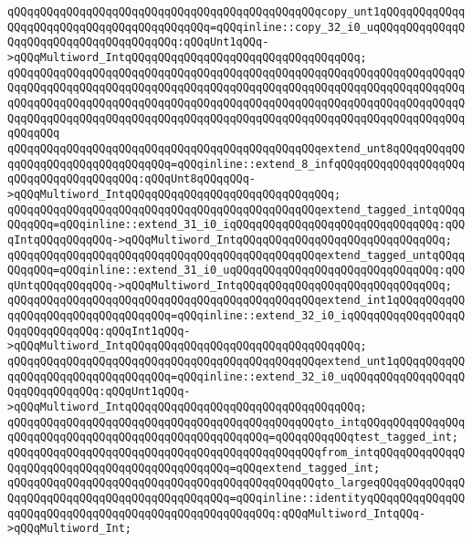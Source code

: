 \verb|qQQqqQQqqQQqqQQqqQQqqQQqqQQqqQQqqQQqqQQqqQQqqQQqcopy_unt1qQQqqQQqqQQqqQQqqQQqqQQqqQQqqQQqqQQqqQQqqQQq=qQQqinline::copy_32_i0_uqQQqqQQqqQQqqQQqqQQqqQQqqQQqqQQqqQQqqQQq:qQQqUnt1qQQq->qQQqMultiword_IntqQQqqQQqqQQqqQQqqQQqqQQqqQQqqQQqqQQq;|\newline
\verb|qQQqqQQqqQQqqQQqqQQqqQQqqQQqqQQqqQQqqQQqqQQqqQQqqQQqqQQqqQQqqQQqqQQqqQQqqQQqqQQqqQQqqQQqqQQqqQQqqQQqqQQqqQQqqQQqqQQqqQQqqQQqqQQqqQQqqQQqqQQqqQQqqQQqqQQqqQQqqQQqqQQqqQQqqQQqqQQqqQQqqQQqqQQqqQQqqQQqqQQqqQQqqQQqqQQqqQQqqQQqqQQqqQQqqQQqqQQqqQQqqQQqqQQqqQQqqQQqqQQqqQQqqQQqqQQqqQQqqQQqqQQqqQQq|\newline
\verb|qQQqqQQqqQQqqQQqqQQqqQQqqQQqqQQqqQQqqQQqqQQqqQQqextend_unt8qQQqqQQqqQQqqQQqqQQqqQQqqQQqqQQqqQQq=qQQqinline::extend_8_infqQQqqQQqqQQqqQQqqQQqqQQqqQQqqQQqqQQqqQQq:qQQqUnt8qQQqqQQq->qQQqMultiword_IntqQQqqQQqqQQqqQQqqQQqqQQqqQQqqQQq;|\newline
\verb|qQQqqQQqqQQqqQQqqQQqqQQqqQQqqQQqqQQqqQQqqQQqqQQqextend_tagged_intqQQqqQQqqQQq=qQQqinline::extend_31_i0_iqQQqqQQqqQQqqQQqqQQqqQQqqQQqqQQq:qQQqIntqQQqqQQqqQQq->qQQqMultiword_IntqQQqqQQqqQQqqQQqqQQqqQQqqQQqqQQq;|\newline
\verb|qQQqqQQqqQQqqQQqqQQqqQQqqQQqqQQqqQQqqQQqqQQqqQQqextend_tagged_untqQQqqQQqqQQq=qQQqinline::extend_31_i0_uqQQqqQQqqQQqqQQqqQQqqQQqqQQqqQQq:qQQqUntqQQqqQQqqQQq->qQQqMultiword_IntqQQqqQQqqQQqqQQqqQQqqQQqqQQqqQQq;|\newline
\verb|qQQqqQQqqQQqqQQqqQQqqQQqqQQqqQQqqQQqqQQqqQQqqQQqextend_int1qQQqqQQqqQQqqQQqqQQqqQQqqQQqqQQqqQQq=qQQqinline::extend_32_i0_iqQQqqQQqqQQqqQQqqQQqqQQqqQQqqQQq:qQQqInt1qQQq->qQQqMultiword_IntqQQqqQQqqQQqqQQqqQQqqQQqqQQqqQQqqQQq;|\newline
\verb|qQQqqQQqqQQqqQQqqQQqqQQqqQQqqQQqqQQqqQQqqQQqqQQqextend_unt1qQQqqQQqqQQqqQQqqQQqqQQqqQQqqQQqqQQq=qQQqinline::extend_32_i0_uqQQqqQQqqQQqqQQqqQQqqQQqqQQqqQQq:qQQqUnt1qQQq->qQQqMultiword_IntqQQqqQQqqQQqqQQqqQQqqQQqqQQqqQQqqQQq;|\newline
\newline
\verb|qQQqqQQqqQQqqQQqqQQqqQQqqQQqqQQqqQQqqQQqqQQqqQQqto_intqQQqqQQqqQQqqQQqqQQqqQQqqQQqqQQqqQQqqQQqqQQqqQQqqQQqqQQq=qQQqqQQqqQQqtest_tagged_int;|\newline
\verb|qQQqqQQqqQQqqQQqqQQqqQQqqQQqqQQqqQQqqQQqqQQqqQQqfrom_intqQQqqQQqqQQqqQQqqQQqqQQqqQQqqQQqqQQqqQQqqQQqqQQq=qQQqextend_tagged_int;|\newline
\newline
\verb|qQQqqQQqqQQqqQQqqQQqqQQqqQQqqQQqqQQqqQQqqQQqqQQqto_largeqQQqqQQqqQQqqQQqqQQqqQQqqQQqqQQqqQQqqQQqqQQqqQQq=qQQqinline::identityqQQqqQQqqQQqqQQqqQQqqQQqqQQqqQQqqQQqqQQqqQQqqQQqqQQqqQQq:qQQqMultiword_IntqQQq->qQQqMultiword_Int;|\newline
